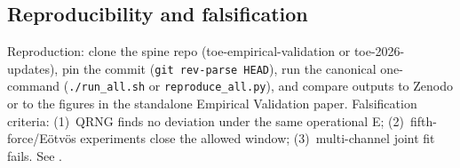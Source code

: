 \subsection{Reproducibility and falsification}
Reproduction: clone the spine repo (toe-empirical-validation or toe-2026-updates), pin the commit (\texttt{git rev-parse HEAD}), run the canonical one-command (\texttt{./run\_all.sh} or \texttt{reproduce\_all.py}), and compare outputs to Zenodo or to the figures in the standalone Empirical Validation paper. Falsification criteria: (1)~QRNG finds no deviation under the same operational E; (2)~fifth-force/Eötvös experiments close the allowed window; (3)~multi-channel joint fit fails. See \cite{Lee2020,Chen2016,MQGT2026,ToE2026v230}.
